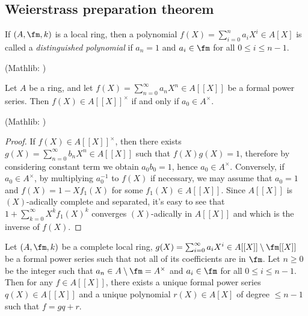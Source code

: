 \subsection{Weierstrass preparation theorem}

\begin{definition}
\label{distinguished-polynomial}
\leanok
If $(A,\fm,k)$ is a local ring, then a polynomial $f(X)=\sum_{i=0}^na_iX^i\in A[X]$
is called a \emph{distinguished polynomial}
if $a_n=1$ and $a_i\in\fm$ for all $0\leq i\leq n-1$.

(Mathlib: )
\end{definition}

\begin{prop}
\label{power-series-invertible-iff}
\leanok
Let $A$ be a ring, and let $f(X)=\sum_{n=0}^\infty a_nX^n\in A[[X]]$
be a formal power series.
Then $f(X)\in A[[X]]^\times$ if and only if $a_0\in A^\times$.

(Mathlib: )
\end{prop}

\begin{proof}
\leanok
If $f(X)\in A[[X]]^\times$,
then there exists $g(X)=\sum_{n=0}^\infty b_nX^n\in A[[X]]$
such that $f(X)g(X)=1$, therefore by considering constant term we obtain
$a_0b_0=1$, hence $a_0\in A^\times$.
Conversely, if $a_0\in A^\times$, by multiplying $a_0^{-1}$ to $f(X)$
if necessary, we may assume that $a_0=1$
and $f(X)=1-Xf_1(X)$ for some $f_1(X)\in A[[X]]$.
Since $A[[X]]$ is $(X)$-adically complete and separated,
it's easy to see that $1+\sum_{k=0}^\infty X^kf_1(X)^k$
converges $(X)$-adically in $A[[X]]$ and which is the inverse of
$f(X)$.
\end{proof}

\begin{prop}
\label{weierstrass-division}
\leanok
Let $(A,\fm,k)$ be a complete local ring,
$g(X)=\sum_{i=0}^\infty a_iX^i\in A[[X]]\setminus\fm[[X]]$ be a formal power series
such that not all of its coefficients are in $\fm$.
Let $n\geq 0$ be the integer such that $a_n\in A\setminus\fm=A^\times$
and $a_i\in\fm$ for all $0\leq i\leq n-1$.
Then for any $f\in A[[X]]$,
there exists a unique formal power series
$q(X)\in A[[X]]$ and a unique polynomial $r(X)\in A[X]$ of degree $\leq n-1$
such that $f=gq+r$.
\end{prop}

